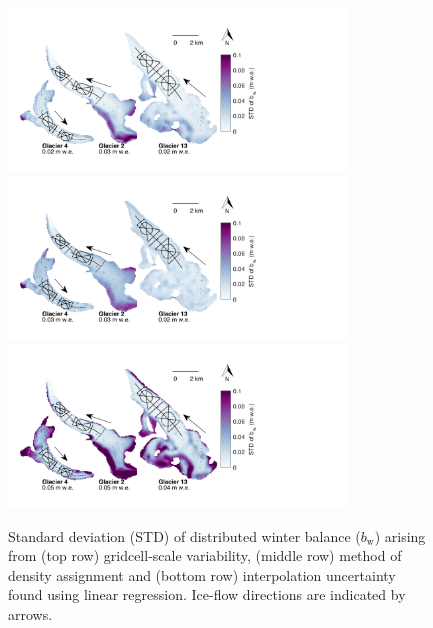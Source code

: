 \documentclass[onecolumn, letterpaper]{igs}
\begin{document}
\pagebreak
\begin{figure}[H]
	\centering
	\includegraphics[width =0.8\textwidth]{LRstd_map_gridcell.pdf}\\
	\includegraphics[width =0.8\textwidth]{LRstd_map_density.pdf}\\
	\includegraphics[width =0.8\textwidth]{LRstd_map_int.pdf}\\
	\caption{Standard deviation (STD) of distributed winter balance ($b_\mathrm{w}$) arising from (top row) gridcell-scale variability, (middle row) method of density assignment and (bottom row) interpolation uncertainty found using linear regression. Ice-flow directions are indicated by arrows.}
\end{figure}
\end{document}
